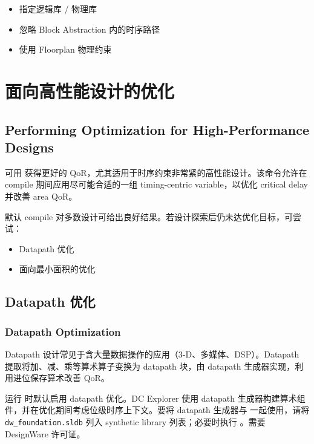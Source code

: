 \begin{seeAlsoBox}
\begin{itemize}
  \item 指定逻辑库 / 物理库
  \item 忽略 Block Abstraction 内的时序路径
  \item 使用 Floorplan 物理约束
\end{itemize}
\end{seeAlsoBox}

\section{面向高性能设计的优化}
\subsection*{Performing Optimization for High-Performance Designs}

可用  获得更好的 QoR，尤其适用于时序约束非常紧的高性能设计。该命令允许在 compile 期间应用尽可能合适的一组 timing-centric variable，以优化 critical delay 并改善 area QoR。

默认 compile 对多数设计可给出良好结果。若设计探索后仍未达优化目标，可尝试：
\begin{itemize}
  \item Datapath 优化
  \item 面向最小面积的优化
\end{itemize}

\subsection{Datapath 优化}
\subsubsection*{Datapath Optimization}

Datapath 设计常见于含大量数据操作的应用（3-D、多媒体、DSP）。Datapath 提取将加、减、乘等算术算子变换为 datapath 块，由 datapath 生成器实现，利用进位保存算术改善 QoR。

运行  时默认启用 datapath 优化。DC Explorer 使用 datapath 生成器构建算术组件，并在优化期间考虑位级时序上下文。要将 datapath 生成器与  一起使用，请将 \texttt{dw\_foundation.sldb} 列入 synthetic library 列表；必要时执行 。需要 DesignWare 许可证。

